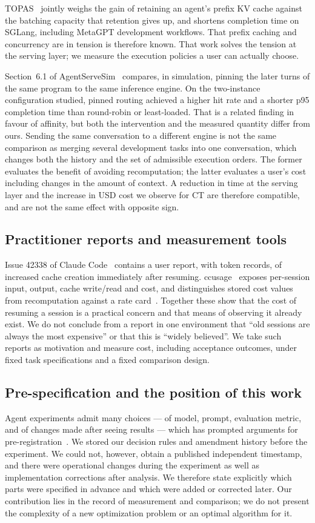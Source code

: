 \documentclass[a4paper,11pt]{article}
\begin{document}
TOPAS~\cite{topas} jointly weighs the gain of retaining an agent's prefix KV cache against the batching capacity that retention gives up, and shortens completion time on SGLang, including MetaGPT development workflows. That prefix caching and concurrency are in tension is therefore known. That work solves the tension at the serving layer; we measure the execution policies a user can actually choose.

Section~6.1 of AgentServeSim~\cite{agentservesim} compares, in simulation, pinning the later turns of the same program to the same inference engine. On the two-instance configuration studied, pinned routing achieved a higher hit rate and a shorter p95 completion time than round-robin or least-loaded. That is a related finding in favour of affinity, but both the intervention and the measured quantity differ from ours. Sending the same conversation to a different engine is not the same comparison as merging several development tasks into one conversation, which changes both the history and the set of admissible execution orders. The former evaluates the benefit of avoiding recomputation; the latter evaluates a user's cost including changes in the amount of context. A reduction in time at the serving layer and the increase in USD cost we observe for CT are therefore compatible, and are not the same effect with opposite sign.

\subsection{Practitioner reports and measurement tools}
Issue 42338 of Claude Code~\cite{resumeissue} contains a user report, with token records, of increased cache creation immediately after resuming. ccusage~\cite{ccusage} exposes per-session input, output, cache write/read and cost, and distinguishes stored cost values from recomputation against a rate card~\cite{ccusagecost}. Together these show that the cost of resuming a session is a practical concern and that means of observing it already exist. We do not conclude from a report in one environment that ``old sessions are always the most expensive'' or that this is ``widely believed''. We take such reports as motivation and measure cost, including acceptance outcomes, under fixed task specifications and a fixed comparison design.

\subsection{Pre-specification and the position of this work}
Agent experiments admit many choices --- of model, prompt, evaluation metric, and of changes made after seeing results --- which has prompted arguments for pre-registration~\cite{prereg}. We stored our decision rules and amendment history before the experiment. We could not, however, obtain a published independent timestamp, and there were operational changes during the experiment as well as implementation corrections after analysis. We therefore state explicitly which parts were specified in advance and which were added or corrected later. Our contribution lies in the record of measurement and comparison; we do not present the complexity of a new optimization problem or an optimal algorithm for it.
\end{document}
